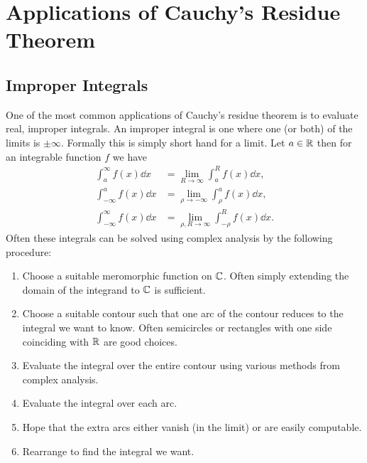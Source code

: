 \documentclass{article}
\begin{document}
    \section{Applications of Cauchy's Residue Theorem}
    \subsection{Improper Integrals}
    One of the most common applications of Cauchy's residue theorem is to evaluate real, improper integrals.
    An improper integral is one where one (or both) of the limits is \(\pm \infty\).
    Formally this is simply short hand for a limit.
    Let \(a\in\mathbb{R}\) then for an integrable function \(f\) we have
    \begin{align*}
        \int_{a}^{\infty} f(x)\dd{x} &= \lim_{R\to\infty} \int_{a}^{R} f(x)\dd{x},\\
        \int_{-\infty}^{a} f(x)\dd{x} &= \lim_{\rho\to-\infty} \int_{\rho}^{a} f(x)\dd{x},\\
        \int_{-\infty}^{\infty} f(x)\dd{x} &= \lim_{\rho, R\to\infty} \int_{-\rho}^{R} f(x) \dd{x}.
    \end{align*}
    Often these integrals can be solved using complex analysis by the following procedure:
    \begin{enumerate}
        \item Choose a suitable meromorphic function on \(\mathbb{C}\).
        Often simply extending the domain of the integrand to \(\mathbb{C}\) is sufficient.
        \item Choose a suitable contour such that one arc of the contour reduces to the integral we want to know.
        Often semicircles or rectangles with one side coinciding with \(\mathbb{R}\) are good choices.
        \item Evaluate the integral over the entire contour using various methods from complex analysis.
        \item Evaluate the integral over each arc.
        \item Hope that the extra arcs either vanish (in the limit) or are easily computable.
        \item Rearrange to find the integral we want.
    \end{enumerate}
\end{document}
